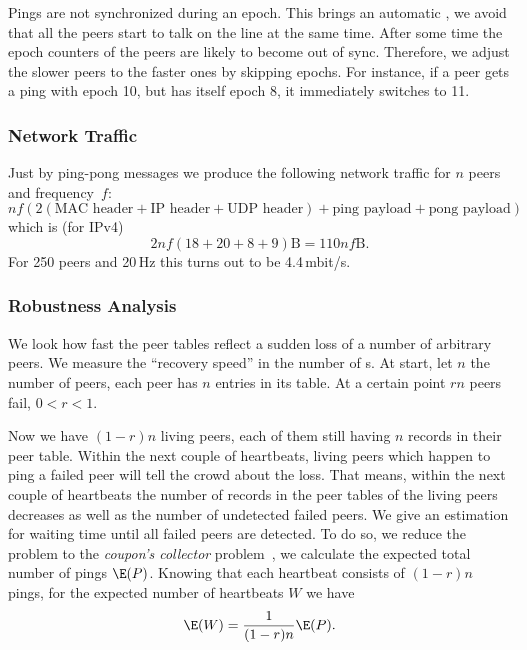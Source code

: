 Pings are not synchronized during an epoch.
This brings an automatic , \ie we avoid that all the peers start to talk on the line at the same time.
After some time the epoch counters of the peers are likely to become out of sync.
Therefore, we adjust the slower peers to the faster ones by skipping epochs.
For instance, if a peer gets a ping with epoch 10, but has itself epoch 8, it immediately switches to 11.

\subsubsection{Network Traffic}
Just by ping-pong messages we produce the following network traffic for $n$ peers and frequency~$f$:
\[ nf(2(\text{MAC header} + \text{IP header} + \text{UDP header}) + \text{ping payload} + \text{pong payload}) \]
which is (for IPv4)
\[ 2nf(18 +  20 + 8 + 9) \text{B} =  110nf \text{B}. \]
For 250 peers and 20\,Hz this turns out to be 4.4\,mbit/s.

\subsubsection{Robustness Analysis}
We look how fast the peer tables reflect a sudden loss of a number of arbitrary peers. 
We measure the ``recovery speed'' in the number of s.
At start, let $n$ the number of peers, \ie each peer has $n$ entries in its table.
At a certain point $rn$ peers fail, $0<r<1$.

Now we have $(1-r)n$ living peers, each of them still having $n$ records in their peer table.
Within the next couple of heartbeats, living peers which happen to ping a failed peer will tell the crowd about the loss.
That means, within the next couple of heartbeats the number of records in the peer tables of the living peers decreases as well as the number of undetected failed peers.
We give an estimation for waiting time until all failed peers are detected.
To do so, we reduce the problem to the \emph{coupon's collector} problem~\cite{feller68}, \ie we calculate the expected total number of pings $\E(P)$.
Knowing that each heartbeat consists of $(1-r)n$ pings, for the expected number of heartbeats $W$ we have
\[ \E(W) = \frac{1}{(1-r)n}\E(P). \]

